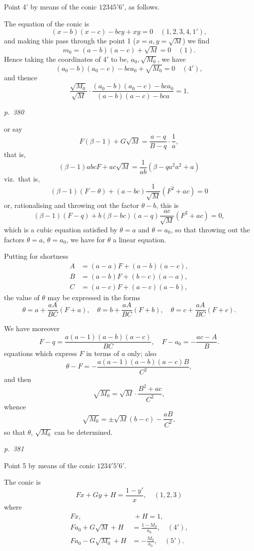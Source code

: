 \documentclass[11pt,a4paper]{book}
\begin{document}
Point 4' by means of the conic $123 4 5' 6'$, as follows.

The equation of the conic is
\[
(x - b)(x - c) - bc y + x y = 0\quad (1, 2, 3, 4, 1'),
\]
and making this pass through the point 1 ($x = a, y = \sqrt{M}$) we find
\[
m_0 = (a - b)(a - c) + \sqrt{M} = 0 \quad (1).
\]
Hence taking the coordinates of $4'$ to be, $a_0, \sqrt{M_0}$, we have
\[
(a_0 - b)(a_0 - c) - bc a_0 + \sqrt{M_0} = 0 \quad (4'),
\]
and thence
\[
\frac{\sqrt{M_0}}{\sqrt{M}} \cdot \frac{(a_0 - b)(a_0 - c) - bc a_0}{(a - b)(a - c) - bc a} = 1.
\]

\clearpage

\bigskip
\textit{p.~380}
\smallskip

\noindent
or say
\[
F(\beta - 1) + G \sqrt{M} = \frac{a - q}{B - q} \cdot \frac{1}{a},
\]
that is,
\[
(\beta - 1) abc F + a c \sqrt{M} = \frac{1}{a b}(\beta - q a^2 a^2 + a)
\]
viz.\ that is,
\[
(\beta - 1)(F - \theta) + (a - bc)\frac{1}{\sqrt{M}}(F^2 + a c) = 0
\]
or, rationalising and throwing out the factor $\theta - b$, this is
\[
(\beta - 1)(F - q) + b(\beta - bc)(a - q)\frac{a c}{\sqrt{M}}(F^2 + a c) = 0,
\]
which is a cubic equation satisfied by $\theta = a$ and $\theta = a_0$, so that throwing out the
factors $\theta = a$, $\theta = a_0$, we have for $\theta$ a linear equation.

Putting for shortness
\begin{align*}
A &= (a - a)F + (a - b)(a - c), \\
B &= (a - b)F + (b - c)(a - a), \\
C &= (a - c)F + (a - c)(a - b),
\end{align*}
the value of $\theta$ may be expressed in the forms
\[
\theta = a + \frac{a A}{B C}(F + a), \quad \theta = b + \frac{a A}{B C}(F + b), \quad \theta = c + \frac{a A}{B C}(F + c).
\]

We have moreover
\[
F - q = \frac{a(a - 1)(a - b)(a - c)}{B C}, \quad F - a_0 = -\frac{a c - A}{B}.
\]
equations which express $F$ in terms of $a$ only; also
\[
\theta - F = -\frac{a(a - 1)(a - b)(a - c) B}{C^2},
\]
and then
\[
\sqrt{M_0} = \sqrt{M} \cdot \frac{B^2 + a c}{C^2},
\]
whence
\[
\sqrt{M_0} = \pm \sqrt{M}(b - c) - \frac{a B}{C^2},
\]
so that $\theta$, $\sqrt{M_0}$ can be determined.

\clearpage

\bigskip
\textit{p.~381}
\smallskip

\noindent
Point 5 by means of the conic $1234'5'6'$.

The conic is
\[
Fx + Gy + H = \frac{1 - y'}{x}, \quad (1, 2, 3)
\]
where
\begin{align*}
Fx,\ &\ +H = 1, \\
Fa_0 + G \sqrt{M} + H &= \frac{1 - M_0}{a_0}, \quad (4'), \\
Fa_0 - G \sqrt{M_0} + H &= -\frac{M_0}{a_0}, \quad (5').
\end{align*}
\end{document}
